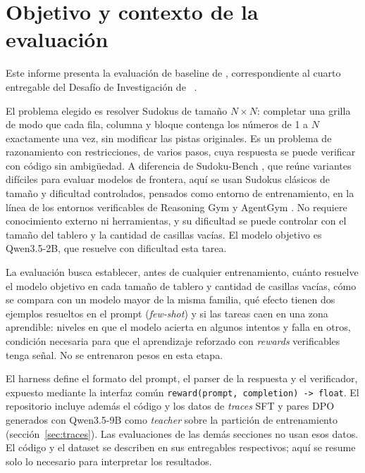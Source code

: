 \section{Objetivo y contexto de la evaluación}
\label{sec:contexto}

Este informe presenta la evaluación de baseline de
\NombreProyecto, correspondiente al cuarto entregable del
Desafío de Investigación de \CodigoCurso\ \citep{enunciado2026}.

El problema elegido es resolver Sudokus de tamaño $N \times N$: completar
una grilla de modo que cada fila, columna y bloque contenga los números
de 1 a $N$ exactamente una vez, sin modificar las pistas originales. Es
un problema de razonamiento con restricciones, de varios pasos, cuya
respuesta se puede verificar con código sin ambigüedad. A diferencia de
Sudoku-Bench \citep{seely2025sudokubench}, que reúne variantes difíciles para
evaluar modelos de frontera, aquí se usan Sudokus clásicos de tamaño y
dificultad controlados, pensados como entorno de entrenamiento, en la línea de
los entornos verificables de Reasoning Gym \citep{stojanovski2025reasoninggym} y
AgentGym \citep{xi2025agentgym}. No requiere
conocimiento externo ni herramientas, y su dificultad se puede controlar
con el tamaño del tablero y la cantidad de casillas vacías. El modelo
objetivo es Qwen3.5-2B, que resuelve con dificultad esta tarea.

La evaluación busca establecer, antes de cualquier entrenamiento, cuánto
resuelve el modelo objetivo en cada tamaño de tablero y cantidad de casillas
vacías, cómo se compara con un modelo mayor de la misma familia, qué efecto
tienen dos ejemplos resueltos en el prompt (\emph{few-shot}) y si las tareas
caen en una zona aprendible: niveles en que el modelo acierta en algunos
intentos y falla en otros, condición necesaria para que el aprendizaje reforzado con \emph{rewards} verificables \citep{lambert2024tulu3,deepseekr1} tenga señal. No se entrenaron pesos
en esta etapa.

El harness define el formato del prompt, el parser de la respuesta y el
verificador, expuesto mediante la interfaz común
\texttt{reward(prompt, completion) -> float}. El repositorio incluye además el
código y los datos de \emph{traces} SFT y pares DPO generados con Qwen3.5-9B como
\emph{teacher} sobre la partición de entrenamiento (sección~\ref{sec:traces}).
Las evaluaciones de las demás secciones no usan esos datos. El código y el dataset se describen en
sus entregables respectivos; aquí se resume solo lo necesario para
interpretar los resultados.

